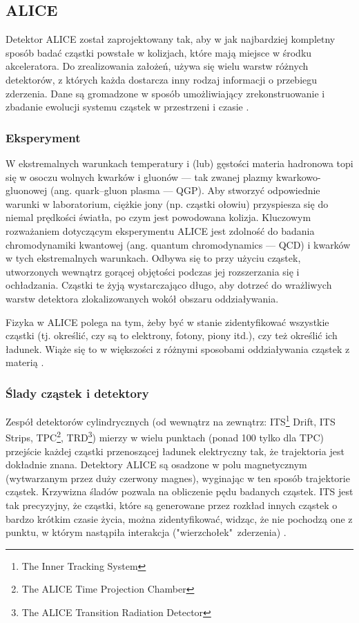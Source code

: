 \subsection{ALICE}
Detektor ALICE został zaprojektowany tak, aby w jak najbardziej kompletny sposób badać cząstki powstałe w kolizjach, które mają miejsce w środku akceleratora. Do zrealizowania założeń, używa się wielu warstw różnych detektorów, z których każda dostarcza inny rodzaj informacji o przebiegu zderzenia. Dane są gromadzone w sposób umożliwiający zrekonstruowanie i zbadanie ewolucji systemu cząstek w przestrzeni i czasie \cite{aliceofficial}. 

\subsubsection{Eksperyment}
W ekstremalnych warunkach temperatury i (lub) gęstości materia hadronowa topi się w osoczu wolnych kwarków i gluonów --- tak zwanej plazmy kwarkowo-gluonowej (ang. quark–gluon plasma --- QGP). Aby stworzyć odpowiednie warunki w laboratorium, ciężkie jony (np. cząstki ołowiu) przyspiesza się do niemal prędkości światła, po czym jest powodowana kolizja. Kluczowym rozważaniem dotyczącym eksperymentu ALICE jest zdolność do badania chromodynamiki kwantowej (ang.  quantum chromodynamics --- QCD) i kwarków w tych ekstremalnych warunkach. Odbywa się to przy użyciu cząstek, utworzonych wewnątrz gorącej objętości podczas jej rozszerzania się i ochładzania. Cząstki te żyją wystarczająco długo, aby dotrzeć do wrażliwych warstw detektora zlokalizowanych wokół obszaru oddziaływania.

 Fizyka w ALICE polega na tym, żeby być w stanie zidentyfikować wszystkie cząstki (tj. określić, czy są to elektrony, fotony, piony itd.), czy też określić ich ładunek. Wiąże się to w większości z różnymi sposobami oddziaływania cząstek z materią \cite{aliceexperiment}.

\subsubsection{Ślady cząstek i detektory}
Zespół detektorów cylindrycznych (od wewnątrz na zewnątrz: ITS\footnote{The Inner Tracking System}  Drift, ITS Strips, TPC\footnote{The ALICE Time Projection Chamber}, TRD\footnote{The ALICE Transition Radiation Detector}) mierzy w wielu punktach (ponad 100 tylko dla TPC) przejście każdej cząstki przenoszącej ładunek elektryczny tak, że trajektoria jest dokładnie znana. Detektory ALICE są osadzone w polu magnetycznym (wytwarzanym przez duży czerwony magnes), wyginając w ten sposób trajektorie cząstek. Krzywizna śladów pozwala na obliczenie pędu badanych cząstek. ITS jest tak precyzyjny, że cząstki, które są generowane przez rozkład innych cząstek o bardzo krótkim czasie życia, można zidentyfikować, widząc, że nie pochodzą one z punktu, w którym nastąpiła interakcja ("wierzchołek"\ zderzenia) \cite{trackingparticles}.

